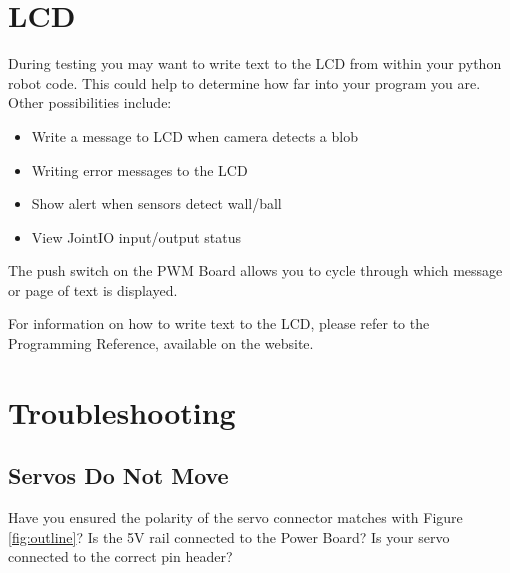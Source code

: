 \documentclass[a4paper, 12pt]{article}
\begin{document}
\section{LCD}
During testing you may want to write text to the LCD from within your python robot code. This could help to determine how far into your program you are. Other possibilities include:

\begin{itemize}
\item Write a message to LCD when camera detects a blob
\item Writing error messages to the LCD
\item Show alert when sensors detect wall/ball
\item View JointIO input/output status 
\end{itemize}

The push switch on the PWM Board allows you to cycle through which message or page of text is displayed. 
\vspace{12pt}

For information on how to write text to the LCD, please refer to the Programming Reference, available on the website.

\section{Troubleshooting}
\subsection{Servos Do Not Move}
Have you ensured the polarity of the servo connector matches with Figure \ref{fig:outline}? Is the 5V rail connected to the Power Board? Is your servo connected to the correct pin header?
\end{document}

